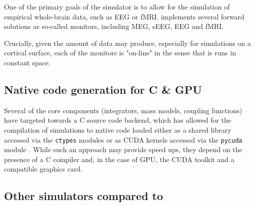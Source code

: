 	One of the primary goals of the \TVB simulator is to allow for the
	simulation of empirical whole-brain data, such as EEG or fMRI.
	\TVB implements several forward solutions as so-called monitors, 
	including MEG, sEEG, EEG and fMRI. 

	Crucially, given the amount of data \TVB may produce, especially for
	simulations on a cortical surface, each of the monitors is "on-line"
	in the sense that is runs in constant space.

\subsection{Native code generation for C \& GPU}

	Several of the core components (integrators, mass models, coupling
	functions) have targeted towards a C source code backend, which has
	allowed for the compilation of simulations to native code loaded 
	either as a shared library accessed via the \texttt{ctypes} modules
	or as CUDA kernels accessed via the \texttt{pycuda} module \cite{pycuda}.
	While such an approach may provide speed ups, they depend on the
	presence of a C compiler and, in the case of GPU, the CUDA toolkit and
	a compatible graphics card. 


\subsection{Other simulators compared to \TVB}

	

